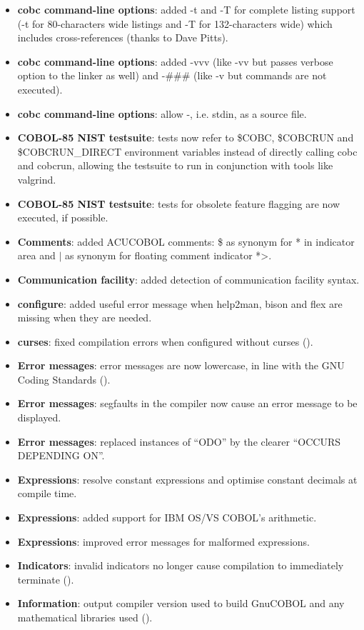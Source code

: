 \begin{itemize}
\item \textbf{cobc command-line options}: added -t and -T for complete listing support (-t for 80-characters wide listings and -T for 132-characters wide) which includes cross-references (thanks to Dave Pitts).
\item \textbf{cobc command-line options}: added -vvv (like -vv but passes verbose option to the linker as well) and -\#\#\# (like -v but commands are not executed).
\item \textbf{cobc command-line options}: allow -, i.e. stdin, as a source file.
\item \textbf{COBOL-85 NIST testsuite}: tests now refer to \$COBC, \$COBCRUN and \$COBCRUN\_DIRECT environment variables instead of directly calling cobc and cobcrun, allowing the testsuite to run in conjunction with tools like valgrind.
\item \textbf{COBOL-85 NIST testsuite}: tests for obsolete feature flagging are now executed, if possible.
\item \textbf{Comments}: added ACUCOBOL comments: \$ as synonym for * in indicator area and $\vert$ as synonym for floating comment indicator *>.
\item \textbf{Communication facility}: added detection of communication facility syntax.
\item \textbf{configure}: added useful error message when help2man, bison and flex are missing when they are needed.
\item \textbf{curses}: fixed compilation errors when configured without curses ().
\item \textbf{Error messages}: error messages are now lowercase, in line with the GNU Coding Standards ().
\item \textbf{Error messages}: segfaults in the compiler now cause an error message to be displayed.
\item \textbf{Error messages}: replaced instances of ``ODO'' by the clearer ``OCCURS DEPENDING ON''.
\item \textbf{Expressions}: resolve constant expressions and optimise constant decimals at compile time.
\item \textbf{Expressions}: added support for IBM OS/VS COBOL's arithmetic.
\item \textbf{Expressions}: improved error messages for malformed expressions.
\item \textbf{Indicators}: invalid indicators no longer cause compilation to immediately terminate ().
\item \textbf{Information}: output compiler version used to build GnuCOBOL and any mathematical libraries used ().

\end{itemize}
